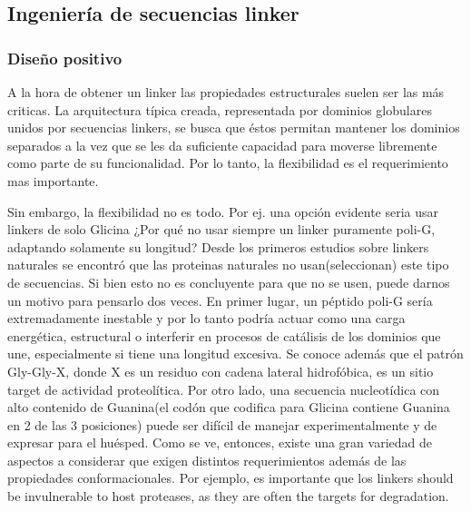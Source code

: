 
\subsection{Ingeniería de secuencias linker}
\subsubsection{Diseño positivo}

A la hora de obtener un linker las propiedades estructurales suelen ser las más criticas.
La arquitectura típica creada, representada por dominios globulares unidos por secuencias linkers, se busca que éstos permitan 
mantener los dominios separados a la vez que se les da suficiente capacidad para moverse libremente como parte de su funcionalidad. 
Por lo tanto, la flexibilidad es el requerimiento mas importante.

Sin embargo, la flexibilidad no es todo. 
Por ej. una opción evidente seria usar linkers de solo Glicina ¿Por qué no usar siempre un linker puramente poli-G, adaptando solamente su longitud?
Desde los primeros estudios sobre linkers naturales \cite{argos1990investigation} se encontró que las proteinas naturales no usan(seleccionan) este tipo de secuencias.
Si bien esto no es concluyente para que no se usen, puede darnos un motivo para pensarlo dos veces.
En primer lugar, un péptido poli-G sería extremadamente inestable y por lo tanto podría actuar como una carga energética, estructural o interferir en procesos de catálisis de los dominios que une, 
especialmente si tiene una longitud excesiva.
Se conoce además que el patrón Gly-Gly-X, donde X es un residuo con cadena lateral hidrofóbica, es un sitio target de actividad proteolítica. 
Por otro lado, una secuencia nucleotídica con alto contenido de Guanina(el codón que codifica para Glicina contiene Guanina en 2 de las 3 posiciones) puede ser difícil de manejar experimentalmente y de expresar para el huésped.
Como se ve, entonces, existe una gran variedad de aspectos a considerar que exigen distintos requerimientos además de las propiedades conformacionales.
Por ejemplo, es importante que los linkers should be invulnerable to host proteases, as they are often the targets for degradation. 


